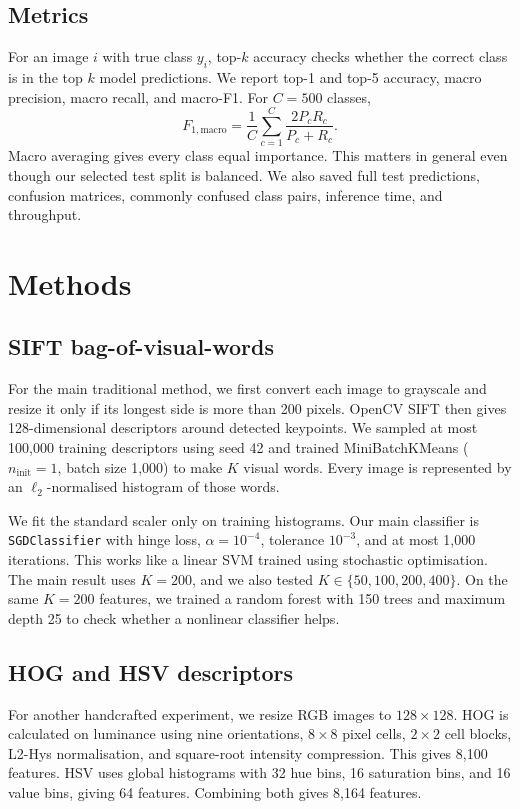 \documentclass[10pt,twocolumn,letterpaper]{article}
\begin{document}
\subsection{Metrics}
For an image $i$ with true class $y_i$, top-$k$ accuracy checks whether the correct class is in the top $k$ model predictions.  We report top-1 and top-5 accuracy, macro precision, macro recall, and macro-F1.  For $C=500$ classes,
\begin{equation}
 F_{1,\mathrm{macro}}=\frac{1}{C}\sum_{c=1}^{C}
 \frac{2P_cR_c}{P_c+R_c}.
\end{equation}
Macro averaging gives every class equal importance.  This matters in general even though our selected test split is balanced.  We also saved full test predictions, confusion matrices, commonly confused class pairs, inference time, and throughput.

\section{Methods}
\subsection{SIFT bag-of-visual-words}
For the main traditional method, we first convert each image to grayscale and resize it only if its longest side is more than 200 pixels.  OpenCV SIFT then gives 128-dimensional descriptors around detected keypoints.  We sampled at most 100,000 training descriptors using seed 42 and trained MiniBatchKMeans ($n_{\mathrm{init}}=1$, batch size 1,000) to make $K$ visual words.  Every image is represented by an $\ell_2$-normalised histogram of those words.

We fit the standard scaler only on training histograms.  Our main classifier is \texttt{SGDClassifier} with hinge loss, $\alpha=10^{-4}$, tolerance $10^{-3}$, and at most 1,000 iterations.  This works like a linear SVM trained using stochastic optimisation.  The main result uses $K=200$, and we also tested $K\in\{50,100,200,400\}$.  On the same $K=200$ features, we trained a random forest with 150 trees and maximum depth 25 to check whether a nonlinear classifier helps.

\subsection{HOG and HSV descriptors}
For another handcrafted experiment, we resize RGB images to $128\times128$.  HOG is calculated on luminance using nine orientations, $8\times8$ pixel cells, $2\times2$ cell blocks, L2-Hys normalisation, and square-root intensity compression.  This gives 8,100 features.  HSV uses global histograms with 32 hue bins, 16 saturation bins, and 16 value bins, giving 64 features.  Combining both gives 8,164 features.
\end{document}
